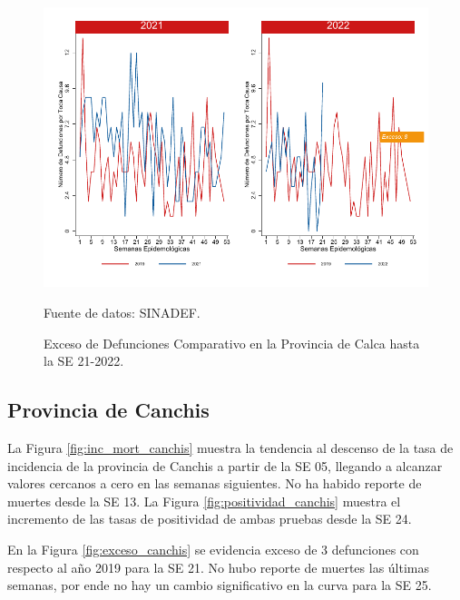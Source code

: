\documentclass[12pt,a4paper,openany]{book}
\begin{document}
	\begin{figure}[h]
		\caption{Exceso de Defunciones Comparativo en la Provincia de Calca hasta la SE 21-2022.}\label{fig:exceso_calca}
		\begin{center}
			\includegraphics[width=0.7\linewidth]{../figuras/exceso_4.pdf}
		\end{center}
		{\footnotesize {Fuente de datos: SINADEF.}}
	\end{figure}
	
	\clearpage
	
	\subsection*{Provincia de Canchis}
	\noindent La Figura \ref{fig:inc_mort_canchis} muestra la tendencia al descenso de la tasa de incidencia de la provincia de Canchis a partir de la SE 05,  llegando a alcanzar valores cercanos a cero en las semanas siguientes. No ha habido reporte de muertes desde la SE 13.    
	\noindent La Figura \ref{fig:positividad_canchis} muestra el incremento de las tasas de positividad de ambas pruebas desde la SE 24.
	
	En la Figura \ref{fig:exceso_canchis} se evidencia exceso de 3 defunciones con respecto al año 2019 para la SE 21.  No hubo reporte de muertes las últimas semanas, por ende no hay un cambio significativo en la curva para la SE 25.
	
\end{document}
